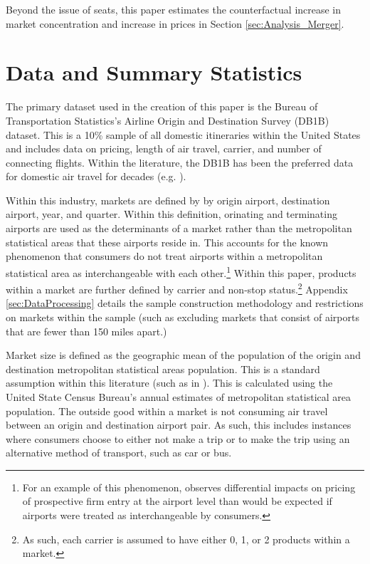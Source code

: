 \documentclass{article}
\begin{document}
    Beyond the issue of seats, this paper estimates the counterfactual increase in market concentration and increase in prices in Section \ref{sec:Analysis_Merger}. 

	\section{Data and Summary Statistics}
	\label{sec:Data}
	The primary dataset used in the creation of this paper is the Bureau of Transportation Statistics's Airline Origin and Destination Survey (DB1B) dataset. This is a 10\% sample of all domestic itineraries within the United States and includes data on pricing, length of air travel, carrier, and number of connecting flights. Within the literature, the DB1B has been the preferred data for domestic air travel for decades (e.g.  \citet{ciliberto_market_2021, berry_tracing_2010, goolsbee_how_2008, peters_evaluating_2006}). 
	
	 Within this industry, markets are defined by by origin airport, destination airport, year, and quarter. Within this definition, orinating and terminating airports are used as the determinants of a market rather than the metropolitan statistical areas that these airports reside in. This accounts for the known phenomenon that consumers do not treat airports within a metropolitan statistical area as interchangeable with each other.\footnote{For an example of this phenomenon, \citet{goolsbee_how_2008} observes differential impacts on pricing of prospective firm entry at the airport level than would be expected if airports were treated as interchangeable by consumers.} Within this paper, products within a market are further defined by carrier and non-stop status.\footnote{As such, each carrier is assumed to have either 0, 1, or 2 products within a market.} Appendix \ref{sec:DataProcessing} details the sample construction methodology and restrictions on markets within the sample (such as excluding markets that consist of airports that are fewer than 150 miles apart.)
	
	Market size is defined as the geographic mean of the population of the origin and destination metropolitan statistical areas population. This is a standard assumption within this literature (such as in \citep{ciliberto_market_2021}). This is calculated using the United State Census Bureau's annual estimates of metropolitan statistical area population. The outside good within a market is not consuming air travel between an origin and destination airport pair. As such, this includes instances where consumers choose to either not make a trip or to make the trip using an alternative method of transport, such as car or bus. 
\end{document}
